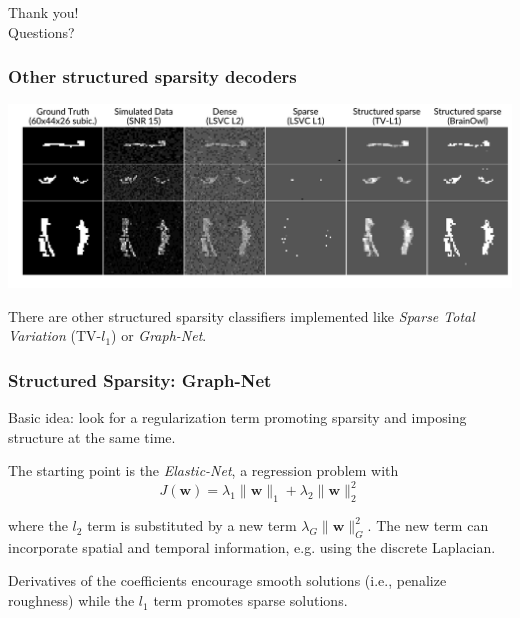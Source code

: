\documentclass[11pt]{beamer}
\begin{document}
\begin{frame}[standout]
    Thank you! \\
    Questions?
\end{frame}

\appendix
\begin{frame}[t]
    \frametitle{Other structured sparsity decoders}
    
    \vspace*{-1cm} 

    \begin{center}
        \includegraphics[scale=0.35]{figures/template_and_weights_4_clfs.png}
    \end{center}

    There are other structured sparsity classifiers implemented like
    \emph{Sparse Total Variation} (TV-$l_1$) or
    \emph{Graph-Net}.

\end{frame}
\begin{frame}[t,shrink]
  \frametitle{Structured Sparsity: Graph-Net}
  Basic idea: look for a regularization term promoting sparsity and imposing
  structure at the same time.

  The starting point is the \emph{Elastic-Net}, a regression problem with
  \[J(\mathbf{w}) = \lambda_{1}\lVert{\mathbf{w}}\rVert_{1} + 
    \lambda_{2}\lVert{\mathbf{w}}\rVert_{2}^{2}\]

  where the \(l_{2}\) term is substituted by a new term
  \(\lambda_{G}\lVert{\mathbf{w}}\rVert_{G}^{2}\). The new term can incorporate
  spatial and temporal information, e.g. using the discrete Laplacian.

  Derivatives of the coefficients encourage smooth solutions
  (i.e., penalize roughness) while the $l_{1}$ term promotes sparse solutions. 

\end{frame}
\end{document}
